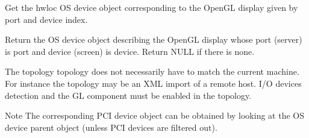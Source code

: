 Get the hwloc OS device object corresponding to the Open\+GL display given by port and device index. 

Return the OS device object describing the Open\+GL display whose port (server) is {\ttfamily port} and device (screen) is {\ttfamily device}. Return N\+U\+LL if there is none.

The topology {\ttfamily topology} does not necessarily have to match the current machine. For instance the topology may be an X\+ML import of a remote host. I/O devices detection and the GL component must be enabled in the topology.

\begin{DoxyNote}{Note}
The corresponding P\+CI device object can be obtained by looking at the OS device parent object (unless P\+CI devices are filtered out). 
\end{DoxyNote}
